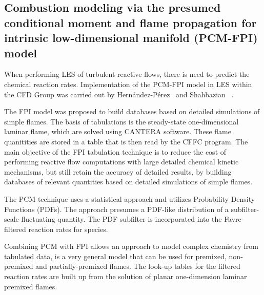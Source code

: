 \subsection{Combustion modeling via the presumed conditional moment and flame propagation for intrinsic low-dimensional manifold (PCM-FPI) model}

When performing LES of turbulent reactive flows, there is need to predict the chemical reaction rates. Implementation of the PCM-FPI model in LES within the CFD Group was carried out by Hern{\'a}ndez-P{\'e}rez~\cite{HPerez:2011} and Shahbazian \etal ~\cite{Shahbazian:2011}.\par

The FPI model was proposed to build databases based on detailed simulations of simple flames. The basis of tabulations is the steady-state one-dimensional laminar flame, which are solved using CANTERA software. These flame quanitities are stored in a table that is then read by the CFFC program. The main objective of the FPI tabulation technique is to reduce the cost of performing reactive
flow computations with large detailed chemical kinetic mechanisms, but still retain the accuracy of detailed results, by building databases of relevant quantities based on detailed simulations of simple flames.~\cite{HPerez:2011} \par

The PCM technique uses a statistical approach and utilizes Probability Density Functions (PDFs). The approach presumes a PDF-like distribution of a subfilter-scale fluctuating quantity. The PDF subfilter is incorporated into the Favre-filtered reaction rates for species.\par

Combining PCM with FPI allows an approach to model complex chemistry from tabulated data, is a very general model that can be used for premixed, non-premixed and partially-premixed flames. The look-up tables for the filtered reaction rates are built up from the solution of planar one-dimension laminar premixed flames.\par
